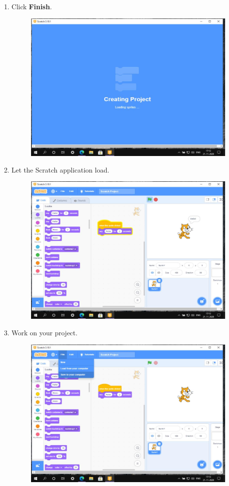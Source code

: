 \documentclass[a4paper]{article}
\begin{document}
\begin{enumerate}
    \item Click \textbf{Finish}.

          \begin{figure}[H]
              \centering
              \includegraphics[width = .8\linewidth]{06}
          \end{figure}

    \item Let the Scratch application load.

          \begin{figure}[H]
              \centering
              \includegraphics[width = .8\linewidth]{07}
          \end{figure}

    \item Work on your project.

          \begin{figure}[H]
              \centering
              \includegraphics[width = .8\linewidth]{08}
          \end{figure}


\end{enumerate}
\end{document}
